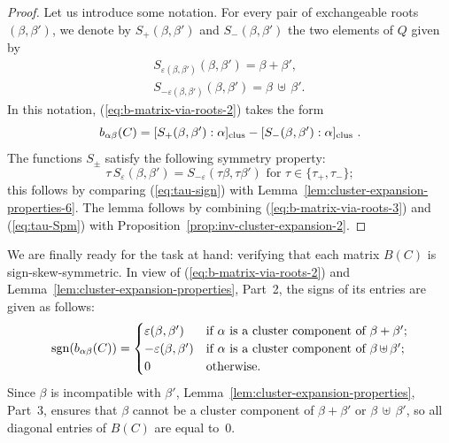 \documentclass[letterpaper]{amsart}
\numberwithin{equation}{section}
\theoremstyle{definition}
\def\subplus{{\,\uplus\,} }
\begin{document}
\begin{proof} 
Let us introduce some notation. 
For every pair of exchangeable roots 
$(\beta, \beta')$, we denote by $S_+ (\beta, \beta')$ and 
$S_- (\beta, \beta')$ the two elements of $Q$ given by 
\begin{equation} 
\label{eq:Spm-def} 
\begin{array}{r} 
S_{\varepsilon(\beta,\beta')}(\beta, \beta') = \beta + \beta', \\[.05in] 
S_{-\varepsilon(\beta,\beta')}(\beta, \beta') = \beta \subplus 
\beta'.\, 
\end{array} 
\end{equation} 
In this notation, %
(\ref{eq:b-matrix-via-roots-2}) takes the form 
\begin{equation} 
\label{eq:b-matrix-via-roots-3} 
b_{\alpha\beta}(C) = 
[S_+ (\beta, \beta'): \alpha]_{\rm clus} - 
[S_- (\beta, \beta'): \alpha]_{\rm clus} \ . 
\end{equation} 
The functions $S_\pm$ satisfy 
the following symmetry property: 
\begin{equation} 
\label{eq:tau-Spm} 
\tau\,S_\varepsilon(\beta,\beta')=S_{-\varepsilon}(\tau\beta,\tau\beta') 
\text{\ \ for  $\tau\in\{\tau_+,\tau_-\}$}; 
\end{equation} 
this follows by comparing (\ref{eq:tau-sign}) with 
Lemma~\ref{lem:cluster-expansion-properties-6}. 
The lemma follows by combining (\ref{eq:b-matrix-via-roots-3}) 
and (\ref{eq:tau-Spm}) with Proposition~\ref{prop:inv-cluster-expansion-2}. 
\end{proof} 
 
We are finally ready for the task at hand: verifying that each 
matrix $B(C)$ is sign-skew-symmetric. 
In view of (\ref{eq:b-matrix-via-roots-2}) and 
Lemma~\ref{lem:cluster-expansion-properties}, Part~2, 
the signs of its entries are given as follows: 
\begin{equation} 
\label{eq:sign-of-b} 
{\rm sgn}(b_{\alpha \beta}(C))= 
\begin{cases} 
\varepsilon(\beta, \beta') 
& \text{if $\alpha$ is a cluster component of $\beta + \beta'$;}\\ 
-\varepsilon(\beta, \beta') 
& \text{if $\alpha$ is a cluster component of $\beta \subplus \beta'$;}\\ 
0 & \text{otherwise.} 
\end{cases} 
\end{equation} 
Since $\beta$ is incompatible with $\beta'$, 
Lemma~\ref{lem:cluster-expansion-properties}, Part~3, ensures that 
$\beta$ cannot be a cluster component of 
$\beta + \beta'$ or $\beta \subplus \beta'$, 
so all diagonal entries of $B(C)$ are equal to~$0$. 
 
\end{document}
